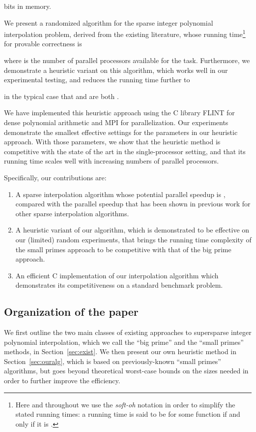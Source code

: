 \documentclass[letterpaper,10pt]{article}
\begin{document}
bits in memory.

We present a randomized algorithm for the sparse integer polynomial
interpolation problem, derived from the existing literature, whose
running time\footnote{
  Here and throughout we use the \emph{soft-oh} notation in order to
  simplify the stated running times: a running time is said to be 
   for some function  if and only if it is
  .
} for provable correctness is

where  is the number of parallel processors available for the
task. Furthermore, we demonstrate a heuristic variant on this algorithm,
which works well in our experimental testing, and reduces the running
time further to

in the typical case that  and  are both .

We have implemented this heuristic approach using the C library FLINT
for dense polynomial arithmetic and MPI for parallelization. Our
experiments demonstrate the smallest effective settings for the
parameters in our heuristic approach. With those parameters, we show
that the heuristic method is competitive with the state of the art in
the single-processor setting, and that its running
time scales well with increasing numbers of parallel processors.

Specifically, our contributions are:
\begin{enumerate}
  \item A sparse interpolation algorithm whose potential parallel
    speedup is , compared with the  parallel speedup
    that has been shown in previous work for other sparse interpolation algorithms.
  \item A heuristic variant of our algorithm, which is demonstrated to
    be effective
    on our (limited) random experiments, that brings the
    running time complexity of the small primes approach to be
    competitive with that of the big prime approach.
  \item An efficient C implementation of our interpolation algorithm
    which demonstrates its competitiveness on a standard benchmark
    problem.
\end{enumerate}

\subsection{Organization of the paper}

We first outline the two main classes of existing approaches to
supersparse integer polynomial interpolation, which we call the ``big
prime'' and the ``small primes'' methods, in Section~\ref{sec:exist}. We
then present our own heuristic method in Section~\ref{sec:ouralg}, 
which is based
on previously-known ``small primes'' algorithms, but goes beyond
theoretical worst-case bounds on the sizes needed in order to further
improve the efficiency.
\end{document}

